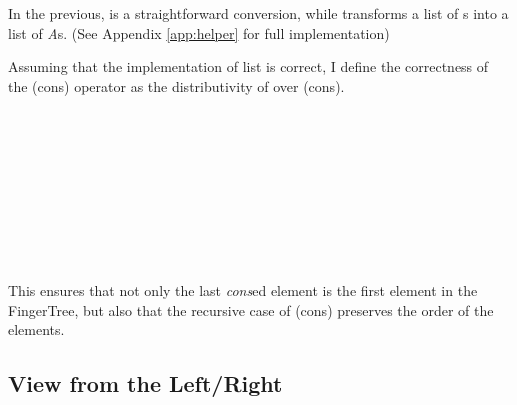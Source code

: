 \documentclass[12pt,twoside,notitlepage]{report}
\begin{document}
In the previous,  is a straightforward conversion, while  transforms a list of s into a list of \textit{A}s. (See Appendix \ref{app:helper} for full implementation)

Assuming that the implementation of list is correct, I define the correctness of the (cons) operator as the distributivity of  over (cons).

\begin{code}
\\
\> \AgdaSymbol{:}  \AgdaSymbol{\{}\AgdaSymbol{\}\{} \AgdaSymbol{:}  \AgdaSymbol{\}\{} \AgdaSymbol{:}   \AgdaSymbol{\}}\<%
\\
\>[6]\<[8]%
\>[8]  \AgdaSymbol{:}   \<%
\\
\>[6]\<[8]%
\>[8]  \AgdaSymbol{:}    \<%
\\
\>[6]\<[8]%
\>[8]\AgdaSymbol{\{} \AgdaSymbol{:} \AgdaSymbol{\}} \<%
\\
\>[6]\<[8]%
\>[8]\AgdaSymbol{(} \AgdaSymbol{:} \AgdaSymbol{)} \<%
\\
\>[6]\<[8]%
\>[8]\AgdaSymbol{(} \AgdaSymbol{:}    \AgdaSymbol{\{}\AgdaSymbol{\})} \<%
\\
\>[6]\<[8]%
\>[8] \AgdaSymbol{(}  \AgdaSymbol{)}  \AgdaSymbol{(}  \AgdaInductiveConstructor{[]}\AgdaSymbol{)} \AgdaFunction{++} \AgdaSymbol{(} \AgdaSymbol{)}\<%
\\
\end{code} 

This ensures that not only the last \textit{cons}ed element is the first element in the FingerTree, but also that the recursive case of (cons) preserves the order of the elements.

\subsection{View from the Left/Right}
\end{document}
